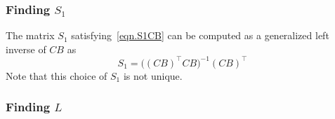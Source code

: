 \documentclass[]{../sty/aiaa-tc}
\begin{document}
  \subsubsection{Finding \texorpdfstring{$S_{1}$}{S1}}

  The matrix $S_{1}$ satisfying\ \eqref{eqn.S1CB} can be computed as a generalized left inverse of $CB$ as
  \begin{equation}
    \label{eqn.S1}
    S_{1}=\bigr((CB)^{\top}CB\bigr)^{-1}(CB)^{\top}
  \end{equation}
  Note that this choice of $S_{1}$ is not unique.

  \subsubsection{Finding \texorpdfstring{$L$}{L}}\label{subsection.obtainX}
\end{document}
